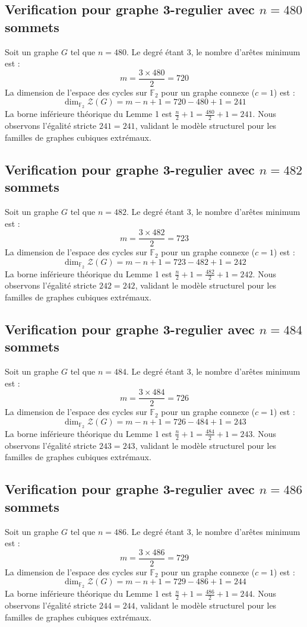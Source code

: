 \documentclass[11pt,a4paper]{article}
\begin{document}
\subsection{Verification pour graphe 3-regulier avec $n=480$ sommets}
Soit un graphe $G$ tel que $n = 480$. Le degré étant 3, le nombre d'arêtes minimum est :
$$ m = \frac{3 \times 480}{2} = 720 $$
La dimension de l'espace des cycles sur $\mathbb{F}_2$ pour un graphe connexe ($c=1$) est :
$$ \dim_{\mathbb{F}_2} \mathcal{Z}(G) = m - n + 1 = 720 - 480 + 1 = 241 $$
La borne inférieure théorique du Lemme 1 est $\frac{n}{2} + 1 = \frac{480}{2} + 1 = 241$.
Nous observons l'égalité stricte $241 = 241$, validant le modèle structurel pour les familles de graphes cubiques extrémaux.

\subsection{Verification pour graphe 3-regulier avec $n=482$ sommets}
Soit un graphe $G$ tel que $n = 482$. Le degré étant 3, le nombre d'arêtes minimum est :
$$ m = \frac{3 \times 482}{2} = 723 $$
La dimension de l'espace des cycles sur $\mathbb{F}_2$ pour un graphe connexe ($c=1$) est :
$$ \dim_{\mathbb{F}_2} \mathcal{Z}(G) = m - n + 1 = 723 - 482 + 1 = 242 $$
La borne inférieure théorique du Lemme 1 est $\frac{n}{2} + 1 = \frac{482}{2} + 1 = 242$.
Nous observons l'égalité stricte $242 = 242$, validant le modèle structurel pour les familles de graphes cubiques extrémaux.

\subsection{Verification pour graphe 3-regulier avec $n=484$ sommets}
Soit un graphe $G$ tel que $n = 484$. Le degré étant 3, le nombre d'arêtes minimum est :
$$ m = \frac{3 \times 484}{2} = 726 $$
La dimension de l'espace des cycles sur $\mathbb{F}_2$ pour un graphe connexe ($c=1$) est :
$$ \dim_{\mathbb{F}_2} \mathcal{Z}(G) = m - n + 1 = 726 - 484 + 1 = 243 $$
La borne inférieure théorique du Lemme 1 est $\frac{n}{2} + 1 = \frac{484}{2} + 1 = 243$.
Nous observons l'égalité stricte $243 = 243$, validant le modèle structurel pour les familles de graphes cubiques extrémaux.

\subsection{Verification pour graphe 3-regulier avec $n=486$ sommets}
Soit un graphe $G$ tel que $n = 486$. Le degré étant 3, le nombre d'arêtes minimum est :
$$ m = \frac{3 \times 486}{2} = 729 $$
La dimension de l'espace des cycles sur $\mathbb{F}_2$ pour un graphe connexe ($c=1$) est :
$$ \dim_{\mathbb{F}_2} \mathcal{Z}(G) = m - n + 1 = 729 - 486 + 1 = 244 $$
La borne inférieure théorique du Lemme 1 est $\frac{n}{2} + 1 = \frac{486}{2} + 1 = 244$.
Nous observons l'égalité stricte $244 = 244$, validant le modèle structurel pour les familles de graphes cubiques extrémaux.
\end{document}
